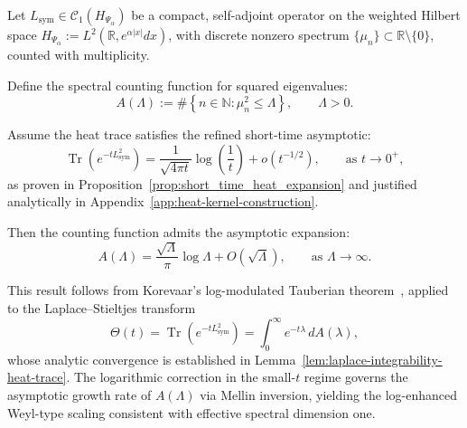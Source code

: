 \begin{lemma}
\label{lem:tauberian-heat-trace-application}
Let \( L_{\mathrm{sym}} \in \mathcal{C}_1(H_{\Psi_\alpha}) \) be a compact, self-adjoint operator on the weighted Hilbert space \( H_{\Psi_\alpha} := L^2(\mathbb{R}, e^{\alpha|x|} dx) \), with discrete nonzero spectrum \( \{ \mu_n \} \subset \mathbb{R} \setminus \{0\} \), counted with multiplicity.

Define the spectral counting function for squared eigenvalues:
\[
A(\Lambda) := \#\left\{ n \in \mathbb{N} : \mu_n^2 \le \Lambda \right\}, \qquad \Lambda > 0.
\]

Assume the heat trace satisfies the refined short-time asymptotic:
\[
\operatorname{Tr}(e^{-t L_{\mathrm{sym}}^2}) = \frac{1}{\sqrt{4\pi t}} \log\left( \frac{1}{t} \right) + o\left( t^{-1/2} \right), \qquad \text{as } t \to 0^+,
\]
as proven in Proposition~\ref{prop:short_time_heat_expansion} and justified analytically in Appendix~\ref{app:heat-kernel-construction}.

Then the counting function admits the asymptotic expansion:
\[
A(\Lambda) = \frac{\sqrt{\Lambda}}{\pi} \log \Lambda + O\left( \sqrt{\Lambda} \right), \qquad \text{as } \Lambda \to \infty.
\]

\medskip
\noindent
This result follows from Korevaar's log-modulated Tauberian theorem~\cite[Ch.~III, §5]{Korevaar2004Tauberian}, applied to the Laplace–Stieltjes transform
\[
\Theta(t) = \operatorname{Tr}(e^{-t L_{\mathrm{sym}}^2}) = \int_0^\infty e^{-t\lambda} \, dA(\lambda),
\]
whose analytic convergence is established in Lemma~\ref{lem:laplace-integrability-heat-trace}. The logarithmic correction in the small-\( t \) regime governs the asymptotic growth rate of \( A(\Lambda) \) via Mellin inversion, yielding the log-enhanced Weyl-type scaling consistent with effective spectral dimension one.
\end{lemma}
